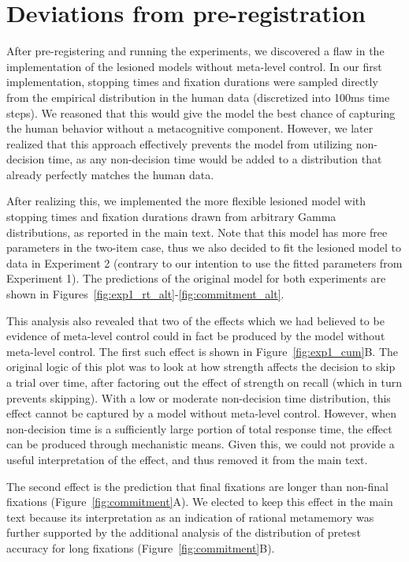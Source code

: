 

\section{Deviations from pre-registration}\label{app:deviation}

After pre-registering and running the experiments, we discovered a flaw in the implementation of the lesioned models without meta-level control. In our first implementation, stopping times and fixation durations were sampled directly from the empirical distribution in the human data (discretized into 100ms time steps). We reasoned that this would give the model the best chance of capturing the human behavior without a metacognitive component. However, we later realized that this approach effectively prevents the model from utilizing non-decision time, as any non-decision time would be added to a distribution that already perfectly matches the human data.

After realizing this, we implemented the more flexible lesioned model with stopping times and fixation durations drawn from arbitrary Gamma distributions, as reported in the main text. Note that this model has more free parameters in the two-item case, thus we also decided to fit the lesioned model to data in Experiment 2 (contrary to our intention to use the fitted parameters from Experiment 1). The predictions of the original model for both experiments are shown in Figures~\ref{fig:exp1_rt_alt}-\ref{fig:commitment_alt}.

This analysis also revealed that two of the effects which we had believed to be evidence of meta-level control could in fact be produced by the model without meta-level control. The first such effect is shown in Figure~\ref{fig:exp1_cum}B. The original logic of this plot was to look at how strength affects the decision to skip a trial over time, after factoring out the effect of strength on recall (which in turn prevents skipping). With a low or moderate non-decision time distribution, this effect cannot be captured by a model without meta-level control. However, when non-decision time is a sufficiently large portion of total response time, the effect can be produced through mechanistic means. Given this, we could not provide a useful interpretation of the effect, and thus removed it from the main text.

The second effect is the prediction that final fixations are longer than non-final fixations (Figure~\ref{fig:commitment}A). We elected to keep this effect in the main text because its interpretation as an indication of rational metamemory was further supported by the additional analysis of the distribution of pretest accuracy for long fixations (Figure~\ref{fig:commitment}B).

